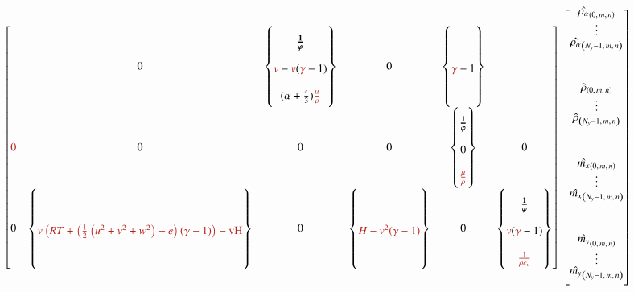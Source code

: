 \documentclass[letterpaper,11pt,nointlimits,reqno,draft]{amsart}
\begin{document}
\begin{sidewaysfigure}
{{\begin{minipage}[c]{\textwidth}
\begin{align*}
\begin{bmatrix}
{  }{
  }
& \entry{\my\mx  }
 0
& \entry{\my\my  }
  \subcoeff{
 \bm{\frac{1}{\vp}} %
  }{
 \ind{v}-\ind{v} (\ind{\gamma} -1)
  }{
 (\alpha +\frac{4}{3}) \ind{\frac{\mu}{\rho}}
  }
& \entry{\my\mz  }
 0
& \entry{\my{}e  }
  \subcoeff{
  }{
 \ind{\gamma} -1 
  }{
  }
\\\entry{\mz\rho_{\alpha} }
 \ind{0}
& 
\entry{\mz\rho}
 0
& \entry{\mz\mx }
 0
& \entry{\mz\my }
 0 
& \entry{\mz\mz }
  \subcoeff{
 \bm{\frac{1}{\vp}} %
  }{
 0 
  }{
 \ind{\frac{\mu}{\rho}}
  }
& \entry{\mz{}e }
 0
\\\entry{e\rho_{\alpha} }
 0 
& 
\entry{e\rho  }
  \subcoeff{
  }{
 \ind{v \left(R T+\left(\frac{1}{2} \left(u^2+v^2+w^2\right)-e\right) (\gamma -1)\right)-\text{vH}}
  }{
  }
& \entry{e\mx   }
 0
& \entry{e\my   }
  \subcoeff{
  }{
 \ind{H-v^2 (\gamma -1)}
  }{
  }
& \entry{e\mz   }
 0 
& \entry{ee     }
  \subcoeff{
 \bm{\frac{1}{\vp}} %
  }{
 \ind{v} (\ind{\gamma} -1)
  }{
 \ind{\frac{1}{\rho c_v}}
  }
\end{bmatrix}
\renewcommand{\arraystretch}{0.6}
\begin{bmatrix}
  \hat{\rho_{\alpha}}_{\left(0,\,m,\,n\right)} \\
  \vdots \\
  \hat{\rho_{\alpha}}_{\left(N_y-1,\,m,\,n\right)} \\
\\%
\\%
\\%
\\%
  \hat{\rho}_{\left(0,\,m,\,n\right)} \\
  \vdots \\
  \hat{\rho}_{\left(N_y-1,\,m,\,n\right)} \\
\\%
\\%
\\%
\\%
  \hat{\mx}_{\left(0,\,m,\,n\right)} \\
  \vdots \\
  \hat{\mx}_{\left(N_y-1,\,m,\,n\right)} \\
\\%
\\%
\\%
\\%
  \hat{\my}_{\left(0,\,m,\,n\right)} \\
  \vdots \\
  \hat{\my}_{\left(N_y-1,\,m,\,n\right)} \\
\\%

\end{bmatrix}
\end{align*}
\end{minipage}}}
\end{sidewaysfigure}
\end{document}
